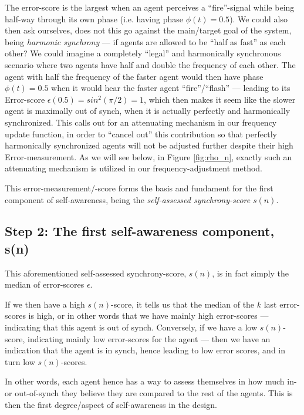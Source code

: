 The error-score is the largest when an agent perceives a ``fire''-signal while being half-way through its own phase (i.e. having phase $\phi(t)=0.5$). We could also then ask ourselves, does not this go against the main/target goal of the system, being \textit{harmonic synchrony} — if agents are allowed to be ``half as fast'' as each other? We could imagine a completely ``legal'' and harmonically synchronous scenario where two agents have half and double the frequency of each other. The agent with half the frequency of the faster agent would then have phase $\phi(t)=0.5$ when it would hear the faster agent ``fire''/``flash'' — leading to its Error-score $\epsilon(0.5) = sin^2(\pi/2) = 1$, which then makes it seem like the slower agent is maximally out of synch, when it is actually perfectly and harmonically synchronized. This calls out for an attenuating mechanism in our frequency update function, in order to ``cancel out'' this contribution so that perfectly harmonically synchronized agents will not be adjusted further despite their high Error-measurement. As we will see below, in Figure \ref{fig:rho_n}, exactly such an attenuating mechanism is utilized in our frequency-adjustment method.

This error-measurement/-score forms the basis and fundament for the first component of self-awareness, being the \textit{self-assessed synchrony-score} $s(n)$.

\subsection{Step 2: The first self-awareness component, s(n)}
\label{s_n}
This aforementioned self-assessed synchrony-score, $s(n)$, is in fact simply the median of error-scores $\epsilon$.

If we then have a high $s(n)$-score, it tells us that the median of the $k$ last error-scores is high, or in other words that we have mainly high error-scores — indicating that this agent is out of synch. Conversely, if we have a low $s(n)$-score, indicating mainly low error-scores for the agent — then we have an indication that the agent is in synch, hence leading to low error scores, and in turn low $s(n)$-scores. 

In other words, each agent hence has a way to assess themselves in how much in- or out-of-synch they believe they are compared to the rest of the agents. This is then the first degree/aspect of  self-awareness in the design.

